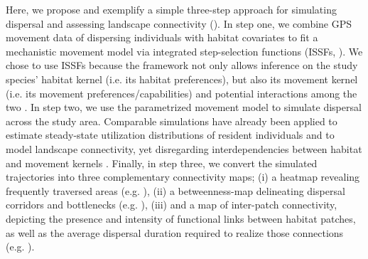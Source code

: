 \documentclass[abstract=on,10pt,a4paper,bibliography=totocnumbered]{article}
\begin{document}
Here, we propose and exemplify a simple three-step approach for simulating
dispersal and assessing landscape connectivity (). In
step one, we combine GPS movement data of dispersing individuals with habitat
covariates to fit a mechanistic movement model via integrated step-selection
functions (ISSFs, \citealp{Avgar.2016}). We chose to use ISSFs because the
framework not only allows inference on the study species' habitat kernel (i.e.
its habitat preferences), but also its movement kernel (i.e. its movement
preferences/capabilities) and potential interactions among the two
\citep{Avgar.2016, Fieberg.2021}. In step two, we use the parametrized movement
model to simulate dispersal across the study area. Comparable simulations have
already been applied to estimate steady-state utilization distributions of
resident individuals \citep{Potts.2013, Signer.2017} and to model landscape
connectivity, yet disregarding interdependencies between habitat and movement
kernels \citep{Clark.2015, Zeller.2020}. Finally, in step three, we convert the
simulated trajectories into three complementary connectivity maps; (i) a heatmap
revealing frequently traversed areas (e.g. \citealp{Hauenstein.2019,
Zeller.2020}), (ii) a betweenness-map delineating dispersal corridors and
bottlenecks (e.g. \citealp{BastilleRousseau.2018}), (iii) and a map of
inter-patch connectivity, depicting the presence and intensity of functional
links between habitat patches, as well as the average dispersal duration
required to realize those connections (e.g. \citealp{Gustafson.1996,
Kanagaraj.2013}).

\end{document}
